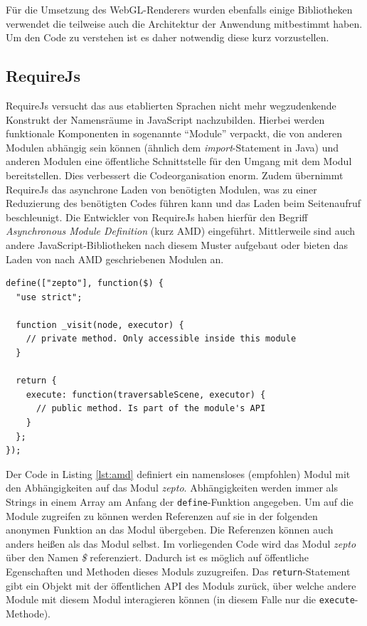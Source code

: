 Für die Umsetzung des WebGL-Renderers wurden ebenfalls einige Bibliotheken verwendet die teilweise auch die Architektur der Anwendung mitbestimmt haben. Um den Code zu verstehen ist es daher notwendig diese kurz vorzustellen.

\subsection{RequireJs}
RequireJs versucht das aus etablierten Sprachen nicht mehr wegzudenkende Konstrukt der Namensräume in JavaScript nachzubilden. Hierbei werden funktionale Komponenten in sogenannte "`Module"' verpackt, die von anderen Modulen abhängig sein können (ähnlich dem \textit{import}-Statement in Java) und anderen Modulen eine öffentliche Schnittstelle für den Umgang mit dem Modul bereitstellen. Dies verbessert die Codeorganisation enorm. Zudem übernimmt RequireJs das asynchrone Laden von benötigten Modulen, was zu einer Reduzierung des benötigten Codes führen kann und das Laden beim Seitenaufruf beschleunigt. Die Entwickler von RequireJs haben hierfür den Begriff \textit{Asynchronous Module Definition} (kurz AMD) eingeführt. Mittlerweile sind auch andere JavaScript-Bibliotheken nach diesem Muster aufgebaut oder bieten das Laden von nach AMD geschriebenen Modulen an.
\lstset{language=JavaScript}
\begin{lstlisting}[caption={Aufbau eines Moduls nach AMD in Osiris}, label={lst:amd}]
define(["zepto"], function($) {
  "use strict";

  function _visit(node, executor) {
    // private method. Only accessible inside this module
  }

  return {
    execute: function(traversableScene, executor) {
      // public method. Is part of the module's API
    }
  };
});
\end{lstlisting}
Der Code in Listing \ref{lst:amd} definiert ein namensloses (empfohlen) Modul mit den Abhängigkeiten auf das Modul \textit{zepto}. Abhängigkeiten werden immer als Strings in einem Array am Anfang der \texttt{define}-Funktion angegeben. Um auf die Module zugreifen zu können werden Referenzen auf sie in der folgenden anonymen Funktion an das Modul übergeben. Die Referenzen können auch anders heißen als das Modul selbst. Im vorliegenden Code wird das Modul \textit{zepto} über den Namen \textit{\$} referenziert. Dadurch ist es möglich auf öffentliche Egenschaften und Methoden dieses Moduls zuzugreifen. Das \texttt{return}-Statement gibt ein Objekt mit der öffentlichen API des Moduls zurück, über welche andere Module mit diesem Modul interagieren können (in diesem Falle nur die \texttt{execute}-Methode).

